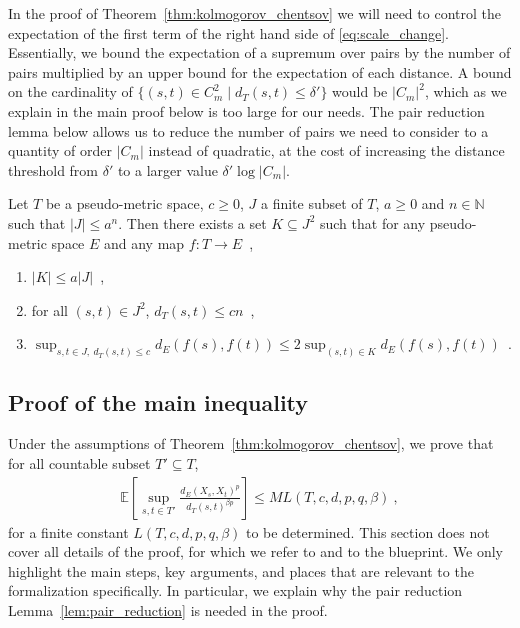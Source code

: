 \documentclass[lean]{Draft}
\begin{document}
In the proof of Theorem~\ref{thm:kolmogorov_chentsov} we will need to control the expectation of the first term of the right hand side of \eqref{eq:scale_change}.
Essentially, we bound the expectation of a supremum over pairs by the number of pairs multiplied by an upper bound for the expectation of each distance.
A bound on the cardinality of $\{(s, t) \in C_m^2 \mid d_T(s, t) \le \delta'\}$ would be $\lvert C_m \rvert^2$, which as we explain in the main proof below is too large for our needs.
The pair reduction lemma below allows us to reduce the number of pairs we need to consider to a quantity of order $\lvert C_m \rvert$ instead of quadratic, at the cost of increasing the distance threshold from $\delta'$ to a larger value $\delta' \log \lvert C_m \rvert$.

\begin{lemma}\label{lem:pair_reduction}
Let $T$ be a pseudo-metric space, $c \ge 0$, $J$ a finite subset of $T$, $a \ge 0$ and $n \in \mathbb{N}$ such that $\lvert J \rvert \le a^n$.
Then there exists a set $K \subseteq J^2$ such that for any pseudo-metric space $E$ and any map $f: T \to E$~,
\begin{enumerate}
  \item $\lvert K \rvert \le a \lvert J \rvert$~,
  \item for all $(s, t) \in J^2$, $d_T(s, t) \le cn$~,
  \item $\sup_{s, t \in J, \: d_T(s, t) \le c} d_E(f(s), f(t)) \le 2 \sup_{(s, t) \in K} d_E(f(s), f(t))$~.
\end{enumerate}
\end{lemma}


\subsection{Proof of the main inequality}

Under the assumptions of Theorem~\ref{thm:kolmogorov_chentsov}, we prove that for all countable subset $T' \subseteq T$,
\begin{align*}
  \mathbb{E}\left[ \sup_{s, t \in T'} \frac{d_E(X_s, X_t)^p}{d_T(s, t)^{\beta p}} \right]
  \le M L(T, c, d, p, q, \beta)
  \: ,
\end{align*}
for a finite constant $L(T, c, d, p, q, \beta)$ to be determined.
This section does not cover all details of the proof, for which we refer to \cite{kratschmer2023kolmogorov} and to the blueprint. We only highlight the main steps, key arguments, and places that are relevant to the formalization specifically.
In particular, we explain why the pair reduction Lemma~\ref{lem:pair_reduction} is needed in the proof.
\end{document}
